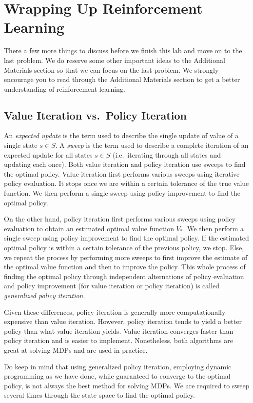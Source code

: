 \section*{Wrapping Up Reinforcement Learning}
There a few more things to discuss before we finish this lab and move on to the last problem.
We do reserve some other important ideas to the Additional Materials section so that we can focus on the last problem.
We strongly encourage you to read through the Additional Materials section to get a better understanding of reinforcement learning.

\subsection*{Value Iteration vs.\ Policy Iteration}
An \emph{expected update} is the term used to describe the single update of value of a single state $s\in S$.
A \emph{sweep} is the term used to describe a complete iteration of an expected update for all states $s\in S$ (i.e.\ iterating through all states and updating each once).
Both value iteration and policy iteration use sweeps to find the optimal policy.
Value iteration first performs various sweeps using iterative policy evaluation.
It stops once we are within a certain tolerance of the true value function.
We then perform a single sweep using policy improvement to find the optimal policy.

On the other hand, policy iteration first performs various sweeps using policy evaluation to obtain an estimated optimal value function $V_*$.
We then perform a single sweep using policy improvement to find the optimal policy.
If the estimated optimal policy is within a certain tolerance of the previous policy, we stop.
Else, we repeat the process by performing more sweeps to first improve the estimate of the optimal value function and then to improve the policy.
This whole process of finding the optimal policy through independent alternations of policy evaluation and policy improvement (for value iteration or policy iteration) is called \emph{generalized policy iteration}.

Given these differences, policy iteration is generally more computationally expensive than value iteration.
However, policy iteration tends to yield a better policy than what value iteration yields.
Value iteration converges faster than policy iteration and is easier to implement.
Nonetheless, both algorithms are great at solving MDPs and are used in practice.

Do keep in mind that using generalized policy iteration, employing dynamic programming as we have done, while guaranteed to converge to the optimal policy, is not always the best method for solving MDPs.
We are required to sweep several times through the state space to find the optimal policy.

